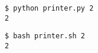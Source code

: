 \documentclass{article}
\begin{document}
\begin{verbatim}
$ python printer.py 2
2
\end{verbatim}


\begin{verbatim}
$ bash printer.sh 2
2
\end{verbatim}
\end{document}

